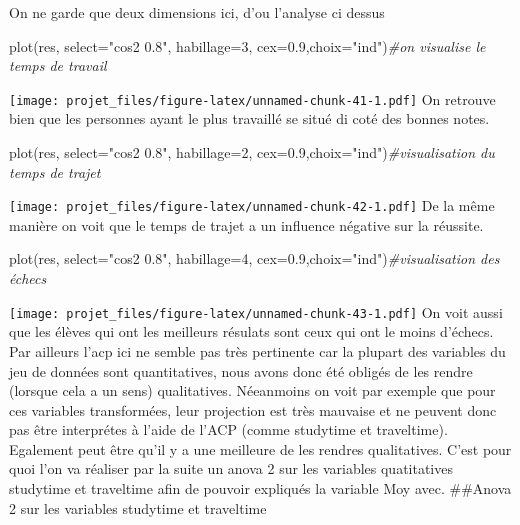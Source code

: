 \documentclass[
]{article}
\newenvironment{Shaded}{\begin{snugshade}}{\end{snugshade}}
\newcommand{\AttributeTok}[1]{\textcolor[rgb]{0.77,0.63,0.00}{#1}}
\newcommand{\CommentTok}[1]{\textcolor[rgb]{0.56,0.35,0.01}{\textit{#1}}}
\newcommand{\DecValTok}[1]{\textcolor[rgb]{0.00,0.00,0.81}{#1}}
\newcommand{\FloatTok}[1]{\textcolor[rgb]{0.00,0.00,0.81}{#1}}
\newcommand{\FunctionTok}[1]{\textcolor[rgb]{0.00,0.00,0.00}{#1}}
\newcommand{\NormalTok}[1]{#1}
\newcommand{\StringTok}[1]{\textcolor[rgb]{0.31,0.60,0.02}{#1}}
\begin{document}
On ne garde que deux dimensions ici, d'ou l'analyse ci dessus

\begin{Shaded}
\begin{Highlighting}[]
\FunctionTok{plot}\NormalTok{(res, }\AttributeTok{select=}\StringTok{"cos2 0.8"}\NormalTok{, }\AttributeTok{habillage=}\DecValTok{3}\NormalTok{, }\AttributeTok{cex=}\FloatTok{0.9}\NormalTok{,}\AttributeTok{choix=}\StringTok{"ind"}\NormalTok{)}\CommentTok{\#on visualise le temps de travail}
\end{Highlighting}
\end{Shaded}

\texttt{[image: projet\_files/figure-latex/unnamed-chunk-41-1.pdf]} On
retrouve bien que les personnes ayant le plus travaillé se situé di coté
des bonnes notes.

\begin{Shaded}
\begin{Highlighting}[]
\FunctionTok{plot}\NormalTok{(res, }\AttributeTok{select=}\StringTok{"cos2 0.8"}\NormalTok{, }\AttributeTok{habillage=}\DecValTok{2}\NormalTok{, }\AttributeTok{cex=}\FloatTok{0.9}\NormalTok{,}\AttributeTok{choix=}\StringTok{"ind"}\NormalTok{)}\CommentTok{\#visualisation du temps de trajet}
\end{Highlighting}
\end{Shaded}

\texttt{[image: projet\_files/figure-latex/unnamed-chunk-42-1.pdf]} De la
même manière on voit que le temps de trajet a un influence négative sur
la réussite.

\begin{Shaded}
\begin{Highlighting}[]
\FunctionTok{plot}\NormalTok{(res, }\AttributeTok{select=}\StringTok{"cos2 0.8"}\NormalTok{, }\AttributeTok{habillage=}\DecValTok{4}\NormalTok{, }\AttributeTok{cex=}\FloatTok{0.9}\NormalTok{,}\AttributeTok{choix=}\StringTok{"ind"}\NormalTok{)}\CommentTok{\#visualisation des échecs}
\end{Highlighting}
\end{Shaded}

\texttt{[image: projet\_files/figure-latex/unnamed-chunk-43-1.pdf]} On
voit aussi que les élèves qui ont les meilleurs résulats sont ceux qui
ont le moins d'échecs. Par ailleurs l'acp ici ne semble pas très
pertinente car la plupart des variables du jeu de données sont
quantitatives, nous avons donc été obligés de les rendre (lorsque cela a
un sens) qualitatives. Néeanmoins on voit par exemple que pour ces
variables transformées, leur projection est très mauvaise et ne peuvent
donc pas être interprétes à l'aide de l'ACP (comme studytime et
traveltime). Egalement peut être qu'il y a une meilleure de les rendres
qualitatives. C'est pour quoi l'on va réaliser par la suite un anova 2
sur les variables quatitatives studytime et traveltime afin de pouvoir
expliqués la variable Moy avec. \#\#Anova 2 sur les variables studytime
et traveltime
\end{document}
